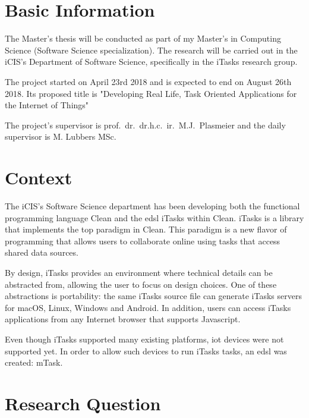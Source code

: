\documentclass{article}
\date{June 12th, 2018}
\author{Matheus Amazonas Cabral de Andrade}
\newcommand{\projecttitle}{Developing Real Life, Task Oriented Applications for the Internet of Things}
\newcommand{\rinus}{prof.~dr.~dr.h.c.~ir.~M.J.~Plasmeier }
\newcommand{\mart}{M. Lubbers MSc.}
\begin{document}
\maketitleru[
    layout=seventeen,
    title=Master's Thesis Proposal,
    subtitle=\projecttitle,
    others={{Supervisors:}{\rinus \\ \mart}}]

\section{Basic Information}

The Master's thesis will be conducted as part of my Master's in Computing Science (Software Science specialization). The research will be carried out in the iCIS's Department of Software Science, specifically in the iTasks research group.

The project started on April 23rd 2018 and is expected to end on August 26th 2018. Its proposed title is "\projecttitle"

The project's supervisor is \rinus and the daily supervisor is \mart

\section{Context}
The iCIS's Software Science department has been developing both the functional programming language Clean and the \acrfull{edsl} iTasks within Clean. iTasks is a library that implements the \acrfull{top} paradigm in Clean. This paradigm is a new flavor of programming that allows users to collaborate online using tasks that access shared data sources.

By design, iTasks provides an environment where technical details can be abstracted from, allowing the user to focus on design choices. One of these abstractions is portability: the same iTasks source file can generate iTasks servers for macOS, Linux, Windows and Android. In addition, users can access iTasks applications from any Internet browser that supports Javascript. 

Even though iTasks supported many existing platforms, \acrfull{iot} devices were not supported yet. In order to allow such devices to run iTasks tasks, an \acrshort{edsl} was created: mTask.  

\section{Research Question}
\end{document}
